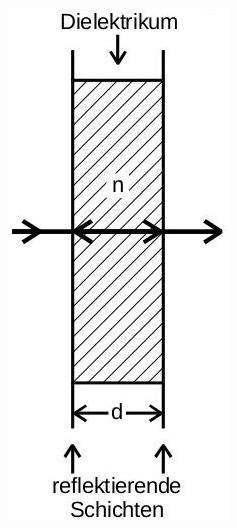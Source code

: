 \begin{figure}
   \centering
    \begin{subfigure}[c]{0.19\textwidth}
        \includegraphics[width=\textwidth]{filter.jpg}

\end{subfigure}
\end{figure}

